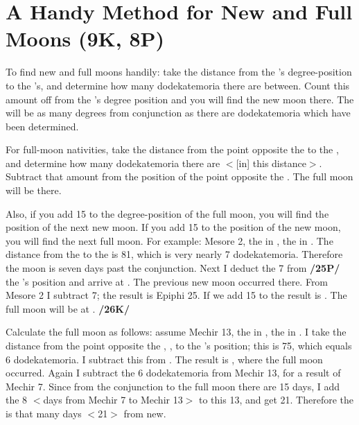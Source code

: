 \section{A Handy Method for New and Full Moons (9K, 8P)}

To find new and full moons handily: take the distance from the \Sun’s degree-position to the \Moon’s, and determine how many dodekatemoria there are between. Count this amount off from the \Sun’s degree position and you will find the new moon there. The \Moon\xspace will be as many degrees from conjunction as there are dodekatemoria which have been determined. 

For full-moon nativities, take the distance from the point opposite the \Sun\xspace to the \Moon, and determine how many dodekatemoria there are $<$[in] this distance$>$. Subtract that amount from the position of the point opposite the \Sun. The full moon will be there. 

Also, if you add 15\deg\xspace to the degree-position of the full moon, you will find the position of the next new moon. If you add 15\deg\xspace to the position of the new moon, you will find the next full moon. For example: Mesore 2, the \Sun\xspace in \Leo\xspace 5\deg, the \Moon\xspace in \Libra\xspace 26\deg. The distance from the \Sun\xspace to the \Moon\xspace is 81\deg, which is very nearly 7 dodekatemoria. Therefore the moon is seven days past the conjunction. Next I deduct the 7 from \textbf{/25P/} the \Sun’s position and arrive at \Cancer\xspace 28\deg. The previous new moon occurred there. From Mesore 2 I subtract 7; the result is Epiphi 25. If we add 15 to \Cancer\xspace 28\deg
the result is \Leo\xspace 13\deg. The full moon will be at \Aquarius\xspace 13\deg. \textbf{/26K/} 

Calculate the full moon as follows: assume Mechir 13, the \Sun\xspace in \Aquarius\xspace 22\deg, the \Moon\xspace in \Scorpio\xspace 7\deg. I take the distance from the point opposite the \Sun, \Leo\xspace 22\deg, to the \Moon’s position; this is
75\deg, which equals 6 dodekatemoria. I subtract this from \Leo\xspace 22\deg. The result is \Leo\xspace 16\deg, where the full moon occurred. Again I subtract the 6 dodekatemoria from Mechir 13, for a result of Mechir 7. Since from the conjunction to the full moon there are 15 days, I add the 8 $<$days from Mechir 7 to Mechir 13$>$ to this 13, and get 21. Therefore the \Moon\xspace is that many days $<$21$>$ from new.

\newpage